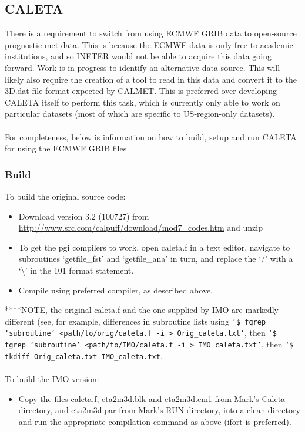\documentclass[10pt,a4paper]{article}
\begin{document}
\subsection{CALETA}
There is a requirement to switch from using ECMWF GRIB data to open-source prognostic met data. This is because the ECMWF data is only free to academic institutions, and so INETER would not be able to acquire this data going forward. Work is in progress to identify an alternative data source. This will likely also require the creation of a tool to read in this data and convert it to the 3D.dat file format expected by CALMET. This is preferred over developing CALETA itself to perform this task, which is currently only able to work on particular datasets (most of which are specific to US-region-only datasets).\\\\
For completeness, below is information on how to build, setup and run CALETA for using the ECMWF GRIB files
\subsubsection{Build}
To build the original source code:
\begin{itemize}
\item Download version 3.2 (100727) from \url{http://www.src.com/calpuff/download/mod7_codes.htm} and unzip
\item To get the pgi compilers to work, open caleta.f in a text editor, navigate to subroutines `getfile\_fst' and `getfile\_ana' in turn, and replace the `/' with a `\textbackslash' in the 101 format statement.
\item Compile using preferred compiler, as described above.
\end{itemize}
****NOTE, the original caleta.f and the one supplied by IMO are markedly different (see, for example, differences in subroutine lists using \texttt{`\$ fgrep `subroutine' <path/to/orig/caleta.f -i > Orig\_caleta.txt'}, then \texttt{`\$ fgrep `subroutine' <path/to/IMO/caleta.f -i > IMO\_caleta.txt'}, then \texttt{`\$ tkdiff Orig\_caleta.txt IMO\_caleta.txt}.\\\\
To build the IMO version:
\begin{itemize}
\item Copy the files caleta.f, eta2m3d.blk and eta2m3d.cm1 from Mark's Caleta directory, and eta2m3d.par from Mark's RUN directory, into a clean directory and run the appropriate compilation command as above (ifort is preferred).
\end{itemize}
\end{document}
